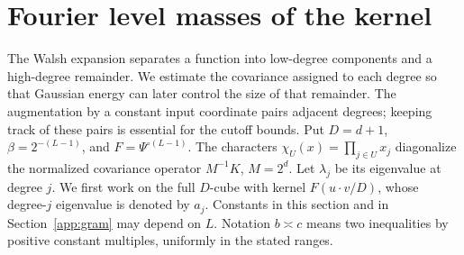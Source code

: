 \section{Fourier level masses of the kernel}\label{app:spectrum}
The Walsh expansion separates a function into low-degree components and
a high-degree remainder. We estimate the covariance assigned to each
degree so that Gaussian energy can later control the size of that
remainder. The augmentation by a constant input coordinate pairs adjacent
degrees; keeping track of these pairs is essential for the cutoff bounds.
Put $D=d+1$, $\beta=2^{-(L-1)}$, and $F=\Psi^{\circ(L-1)}$.
The characters $\chi_U(x)=\prod_{j\in U}x_j$ diagonalize the
normalized covariance operator $M^{-1}K$, $M=2^d$. Let $\lambda_j$
be its eigenvalue at degree $j$. We first work on the full $D$-cube
with kernel $F(u\cdot v/D)$, whose degree-$j$ eigenvalue is denoted
by $a_j$. Constants in this section and in Section~\ref{app:gram} may depend on $L$.
Notation $b\asymp c$ means two inequalities by positive constant
multiples, uniformly in the stated ranges.

